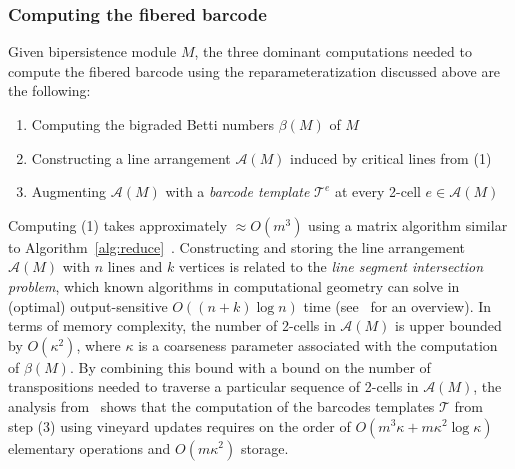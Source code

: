 \documentclass{siamart190516}
\newcommand\sbullet[1][.5]{\mathbin{\vcenter{\hbox{\scalebox{#1}{$\bullet$}}}}}
\begin{document}
\subsubsection*{Computing the fibered barcode}
Given bipersistence module $M$, the three dominant computations needed to compute the fibered barcode using the reparameteratization discussed above are the following: 
\begin{enumerate}
	\item Computing the bigraded Betti numbers $\beta(M)$ of $M$
	\item Constructing a line arrangement $\mathcal{A}(M)$ induced by critical lines from (1) 
	\item Augmenting $\mathcal{A}(M)$ with a \emph{barcode template} $\mathcal{T}^e$ at every 2-cell $e \in \mathcal{A}(M)$
\end{enumerate}
Computing (1) takes approximately $\approx O(m^3)$ using a matrix algorithm similar to Algorithm~\ref{alg:reduce}~\cite{lesnick2019computing}. Constructing and storing the line arrangement $\mathcal{A}(M)$ with $n$ lines and $k$ vertices is related to the \emph{line segment intersection problem}, which known algorithms in computational geometry can solve in (optimal) output-sensitive $O((n+k) \log n)$ time (see~\cite{boissonnat2000robust} for an overview). In terms of memory complexity, the number of 2-cells in $\mathcal{A}(M)$ is upper bounded by $O(\kappa^2)$, where $\kappa$ is a coarseness parameter associated with the computation of $\beta(M)$. 
By combining this bound with a bound on the number of transpositions needed to traverse a particular sequence of 2-cells in $\mathcal{A}(M)$, the analysis from~\cite{lesnick2015interactive} shows that the computation of the barcodes templates $\mathcal{T}$ from step (3) using vineyard updates requires on the order of $O(m^3 \kappa + m \kappa^2 \log \kappa)$ elementary operations and $O(m \kappa^2)$ storage. 
\end{document}

